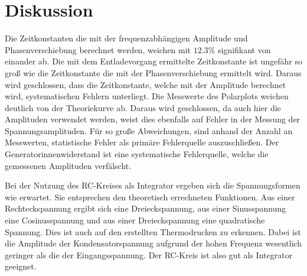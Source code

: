 \section{Diskussion}
\label{sec:Diskussion}

Die Zeitkonstanten die mit der frequenzabhängigen Amplitude und Phasenverschiebung berechnet werden, weichen mit $12.3\%$
signifikant von einander ab.
Die mit dem Entladevorgang ermittelte Zeitkonstante ist ungefähr so groß wie die Zeitkonstante die mit der
Phasenverschiebung ermittelt wird. Daraus wird geschlossen, dass die Zeitkonstante, welche mit der Amplitude
berechnet wird, systematischen Fehlern unterliegt.
Die Messwerte des Polarplots weichen deutlich von der Theoriekurve ab. Daraus wird geschlossen, da auch hier die
Amplituden verwendet werden, weist dies ebenfalls auf Fehler in der Messung der Spannungsamplituden. Für so
große Abweichungen, sind anhand der Anzahl an Messwerten, statistische Fehler als primäre Fehlerquelle auszuschließen.
Der Generatorinnenwiderstand ist eine systematische Fehlerquelle, welche die gemessenen Amplituden verfälscht.

Bei der Nutzung des RC-Kreises als Integrator ergeben sich die Spannungsformen
wie erwartet. Sie entsprechen den theoretisch errechneten Funktionen.
Aus einer Rechteckspannung ergibt sich eine Dreieckspannung, aus einer
Sinusspannung eine Cosinusspannung und aus einer Dreieckspannung eine
quadratische Spannung. Dies ist auch auf den erstellten Thermodrucken zu erkennen.
Dabei ist die Amplitude der Kondensatorspannung aufgrund der hohen Frequenz wesentlich
geringer als die der Eingangsspannung. Der RC-Kreis ist also gut als Integrator
geeignet.
